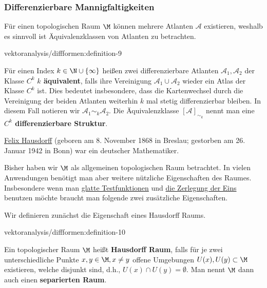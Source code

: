 \documentclass[letterpaper,10pt,english]{jupyterBook}
\begin{document}
\subsubsection{Differenzierbare Mannigfaltigkeiten}
\label{\detokenize{vektoranalysis/diffformen:differenzierbare-mannigfaltigkeiten}}
\par
Für einen topologischen Raum \(\M\) können mehrere Atlanten \(\mathcal{A}\) existieren, weshalb es sinnvoll ist Äquivalenzklassen von Atlanten zu betrachten.
\begin{definition}{}{vektoranalysis/diffformen:definition-9}



\par
Für einen Index \(k\in \N \cup \{\infty\}\) heißen zwei differenzierbare Atlanten \(\mathcal{A}_1, \mathcal{A}_2\) der Klasse \(C^k\) \textbf{\(k\) äquivalent}, falls ihre Vereinigung \(\mathcal{A}_1\cup \mathcal{A}_2\) wieder ein Atlas der Klasse \(C^k\) ist.
Dies bedeutet insbesondere, dass die Kartenwechsel durch die Vereinigung der beiden Atlanten weiterhin \(k\) mal stetig differenzierbar bleiben.
In diesem Fall notieren wir \(\mathcal{A}_1\sim_k \mathcal{A}_2\).
Die Äquivalenzklasse \([\mathcal{A}]_{\sim_k}\) nennt man eine \textbf{\(C^k\) differenzierbare Struktur}.
\end{definition}

\begin{emphBox}{}{}

\par
\href{https://de.wikipedia.org/wiki/Felix\_Hausdorff}{Felix Hausdorff} (geboren am 8. November 1868 in Breslau; gestorben am 26. Januar 1942 in Bonn) war ein deutscher Mathematiker.
\end{emphBox}

\par
Bisher haben wir \(\M\) als allgemeinen topologischen Raum betrachtet.
In vielen Anwendungen benötigt man aber weitere nützliche Eigenschaften des Raumes.
Insbesondere wenn man \href{https://de.wikipedia.org/wiki/Testfunktion}{glatte Testfunktionen} und \href{https://en.wikipedia.org/wiki/Partition\_of\_unity}{die Zerlegung der Eins} benutzen möchte braucht man folgende zwei zusätzliche Eigenschaften.

\par
Wir definieren zunächst die Eigenschaft eines Hausdorff Raums.
\begin{definition}{}{vektoranalysis/diffformen:definition-10}



\par
Ein topologischer Raum \(\M\) heißt \textbf{Hausdorff Raum}, falls für je zwei unterschiedliche Punkte \(x,y\in \M, x\neq y\) offene Umgebungen \(U(x), U(y) \subset \M\) existieren, welche disjunkt sind, d.h., \(U(x)\cap U(y) = \emptyset\).
Man nennt \(\M\) dann auch einen \textbf{separierten Raum}.
\end{definition}
\end{document}
